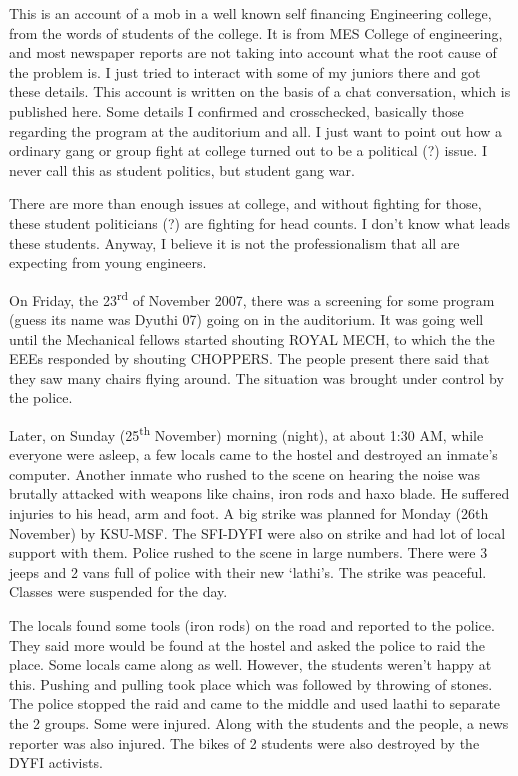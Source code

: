 \vskip 2pt

This is an account of a mob in a well known self financing Engineering college, from the words of students of the college. It is from MES College of engineering, and most newspaper reports are not taking into account what the root cause of the problem is. I just tried to interact with some of my juniors there and got these details. This account is written on the basis of a chat conversation, which is published here. Some details I confirmed and crosschecked, basically those regarding the program at the auditorium and all. I just want to point out how a ordinary gang or group fight at college turned out to be a political (?) issue. I never call this as student politics, but student gang war.

There are more than enough issues at college, and without fighting for those, these student politicians (?) are fighting for head counts. I don’t know what leads these students. Anyway, I believe it is not the professionalism that all are expecting from young engineers.

On Friday, the 23\textsuperscript{rd} of November 2007, there was a screening for some program (guess its name was Dyuthi 07) going on in the auditorium. It was going well until the Mechanical fellows started shouting ROYAL MECH, to which the the EEEs responded by shouting CHOPPERS. The people present there said that they saw many chairs flying around. The situation was brought under control by the police.

Later, on Sunday (25\textsuperscript{th} November) morning (night), at about 1:30 AM, while everyone were asleep, a few locals came to the hostel and destroyed an inmate’s computer. Another inmate who rushed to the scene on hearing the noise was brutally attacked with weapons like chains, iron rods and haxo blade. He suffered injuries to his head, arm and foot.
A big strike was planned for Monday (26th November) by KSU-MSF. The SFI-DYFI were also on strike and had lot of local support with them. Police rushed to the scene in large numbers. There were 3 jeeps and 2 vans full of police with their new ‘lathi’s. The strike was peaceful. Classes were suspended for the day.

The locals found some tools (iron rods) on the road and reported to the police. They said more would be found at the hostel and asked the police to raid the place. Some locals came along as well. However, the students weren't happy at this. Pushing and pulling took place which was followed by throwing of stones. The police stopped the raid and came to the middle and used laathi to separate the 2 groups. Some were injured.
Along with the students and the people, a news reporter was also injured. The bikes of 2 students were also destroyed by the DYFI activists.

